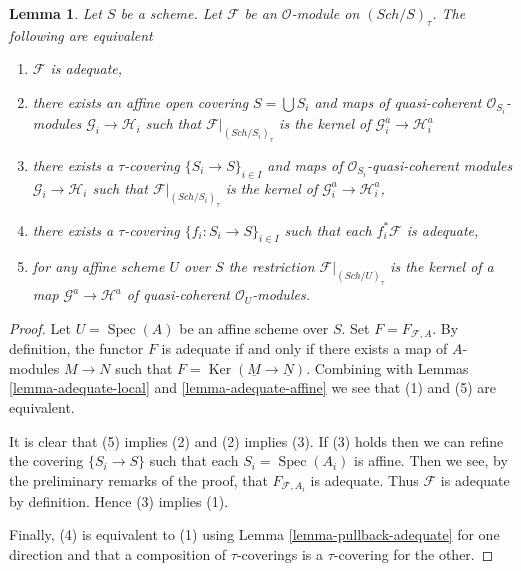 \documentclass{stacks-project}
\theoremstyle{plain}
\newtheorem{lemma}[subsection]{Lemma}
\theoremstyle{definition}
\theoremstyle{remark}
\numberwithin{equation}{subsection}
\def\Spec{\mathop{\mathrm{Spec}}}
\def\Sch{\mathit{Sch}}
\def\Ker{\mathop{\mathrm{Ker}}}
\begin{document}
\begin{lemma}
\label{lemma-adequate-characterize}
Let $S$ be a scheme. Let $\mathcal{F}$ be an $\mathcal{O}$-module on
$(\Sch/S)_\tau$. The following are equivalent
\begin{enumerate}
\item $\mathcal{F}$ is adequate,
\item there exists an affine open covering $S = \bigcup S_i$ and
maps of quasi-coherent $\mathcal{O}_{S_i}$-modules
$\mathcal{G}_i \to \mathcal{H}_i$
such that $\mathcal{F}|_{(\Sch/S_i)_\tau}$ is the
kernel of $\mathcal{G}_i^a \to \mathcal{H}_i^a$
\item there exists a $\tau$-covering $\{S_i \to S\}_{i \in I}$ and
maps of $\mathcal{O}_{S_i}$-quasi-coherent modules
$\mathcal{G}_i \to \mathcal{H}_i$
such that $\mathcal{F}|_{(\Sch/S_i)_\tau}$ is the
kernel of $\mathcal{G}_i^a \to \mathcal{H}_i^a$,
\item there exists a $\tau$-covering $\{f_i : S_i \to S\}_{i \in I}$
such that each $f_i^*\mathcal{F}$ is adequate,
\item for any affine scheme $U$ over $S$ the restriction
$\mathcal{F}|_{(\Sch/U)_\tau}$ is the kernel
of a map $\mathcal{G}^a \to \mathcal{H}^a$ of quasi-coherent
$\mathcal{O}_U$-modules.
\end{enumerate}
\end{lemma}

\begin{proof}
Let $U = \Spec(A)$ be an affine scheme over $S$.
Set $F = F_{\mathcal{F}, A}$. By definition, the functor
$F$ is adequate if and only if there exists a map of $A$-modules
$M \to N$ such that $F = \Ker(\underline{M} \to \underline{N})$.
Combining with
Lemmas \ref{lemma-adequate-local} and
\ref{lemma-adequate-affine}
we see that (1) and (5) are equivalent.

\medskip\noindent
It is clear that (5) implies (2) and (2) implies (3).
If (3) holds then we can refine the covering
$\{S_i \to S\}$ such that each $S_i = \Spec(A_i)$ is affine.
Then we see, by the preliminary remarks of the proof, that
$F_{\mathcal{F}, A_i}$ is adequate. Thus $\mathcal{F}$
is adequate by definition. Hence (3) implies (1).

\medskip\noindent
Finally, (4) is equivalent to (1) using
Lemma \ref{lemma-pullback-adequate}
for one direction and that
a composition of $\tau$-coverings is a $\tau$-covering for the other.
\end{proof}
\end{document}
